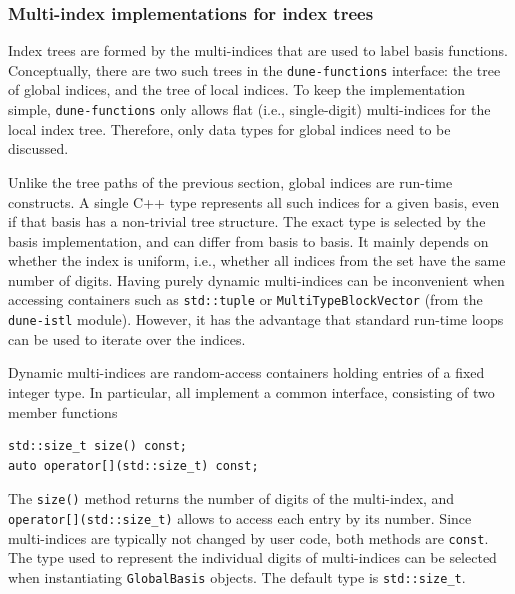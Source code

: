 \documentclass[a4paper,10pt,headings=normal,bibliography=totoc]{scrartcl}
\newcommand{\cpp}[1]{\lstinline[basicstyle=\ttfamily]!#1!}
\newcommand{\dunemodule}[1]{\texttt{#1}}
\begin{document}
\subsubsection{Multi-index implementations for index trees}

Index trees are formed by the multi-indices that are used to label basis functions.
Conceptually, there are two such trees in the \dunemodule{dune-functions} interface:
the tree of global indices, and the tree of local indices.  To keep the implementation simple,
\dunemodule{dune-functions} only allows flat (i.e., single-digit) multi-indices for the local index tree.
Therefore, only data types for global indices need to be discussed.

Unlike the tree paths of the previous section,
global indices are run-time constructs.  A single C++ type represents all such
indices for a given basis, even if that basis has a non-trivial tree structure.
The exact type is selected by the basis implementation, and can differ from basis to basis.
It mainly depends on whether the index is uniform, i.e., whether all indices from the
set have the same number of digits.
Having purely dynamic multi-indices can be inconvenient when accessing
containers such as \cpp{std::tuple}
or \cpp{MultiTypeBlockVector} (from the \dunemodule{dune-istl}
module). However, it has the advantage that standard run-time loops can be used
to iterate over the indices.

Dynamic multi-indices are random-access containers holding entries of a fixed integer type.
In particular, all implement a common interface, consisting of two member functions
%
\begin{lstlisting}[style=Interface]
std::size_t size() const;
auto operator[](std::size_t) const;
\end{lstlisting}
%
The \cpp{size()} method returns the number of digits of the multi-index,
and \cpp{operator[](std::size_t)} allows to access
each entry by its number. Since multi-indices are
typically not changed by user code, both methods are \cpp{const}.
The type used to represent
the individual digits of multi-indices can be selected when instantiating \cpp{GlobalBasis}
objects.  The default type is \cpp{std::size_t}.
\end{document}
